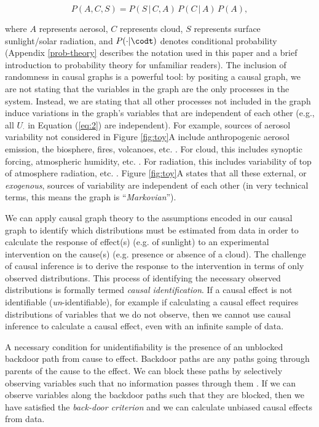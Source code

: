 \documentclass[12pt]{article}
\begin{document}
\begin{equation}
  P(A, C, S) = P(S \, | \,C, A) \, P(C \, | \, A) \, P(A),
\end{equation}

where $A$ represents aerosol, $C$ represents cloud, $S$ represents
surface sunlight/solar radiation, and $P(\cdot | \codt)$ denotes
conditional probability (Appendix \ref{prob-theory} describes the
notation used in this paper and a brief introduction to probability
theory for unfamiliar readers). The inclusion of randomness in causal
graphs is a powerful tool: by positing a causal graph, we are not
stating that the variables in the graph are the only processes in the
system. Instead, we are stating that all other processes not included
in the graph induce variations in the graph's variables that are
independent of each other (e.g., all $U_{\cdot}$ in Equation
(\ref{eq:2}) are independent). For example, sources of aerosol
variability not considered in Figure \ref{fig:toy}A include
anthropogenic aerosol emission, the biosphere, fires, volcanoes,
etc. \citep[e.g.,][]{Boucher2015}. For cloud, this includes synoptic
forcing, atmospheric humidity,
etc. \citep[e.g.,][]{wallace2006atmospheric}. For radiation, this
includes variability of top of atmosphere radiation,
etc. \citep[e.g.,][]{hartmann2015global}. Figure \ref{fig:toy}A states
that all these external, or \textit{exogenous}, sources of variability
are independent of each other (in very technical terms, this means the
graph is ``\textit{Markovian}'').

We can apply causal graph theory
\citep[e.g.,][]{pearl1995causal,shpitser2006} to the assumptions
encoded in our causal graph to identify which distributions must be
estimated from data in order to calculate the response of effect(s)
(e.g. of sunlight) to an experimental intervention on the cause(s)
(e.g. presence or absence of a cloud). The challenge of causal
inference is to derive the response to the intervention in terms of
only observed distributions. This process of identifying the necessary
observed distributions is formally termed \emph{causal
  identification}. If a causal effect is not identifiable
(\emph{un}-identifiable), for example if calculating a causal effect
requires distributions of variables that we do not observe, then we
cannot use causal inference to calculate a causal effect, even with an
infinite sample of data.


A necessary condition for unidentifiability is the presence of an
unblocked backdoor path from cause to effect. Backdoor paths are any
paths going through parents of the cause to the effect. We can block
these paths by selectively observing variables such that no
information passes through them \citep{geiger-d-sep}. If we can
observe variables along the backdoor paths such that they are blocked,
then we have satisfied the \emph{back-door criterion}
\citep{pearl2009} and we can calculate unbiased causal effects from
data.
\end{document}
